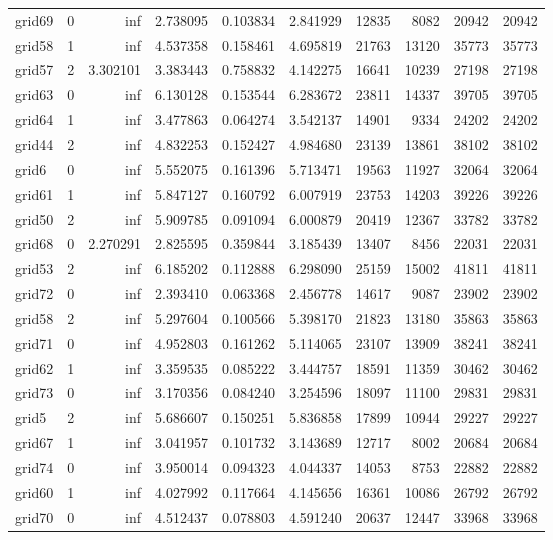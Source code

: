\begin{longtable}{|l|r|r|r|r|r|r|r|r|r|}
grid69 & 0 & inf & 2.738095 & 0.103834 & 2.841929 & 12835 & 8082 & 20942 & 20942 \\
grid58 & 1 & inf & 4.537358 & 0.158461 & 4.695819 & 21763 & 13120 & 35773 & 35773 \\
grid57 & 2 & 3.302101 & 3.383443 & 0.758832 & 4.142275 & 16641 & 10239 & 27198 & 27198 \\
grid63 & 0 & inf & 6.130128 & 0.153544 & 6.283672 & 23811 & 14337 & 39705 & 39705 \\
grid64 & 1 & inf & 3.477863 & 0.064274 & 3.542137 & 14901 & 9334 & 24202 & 24202 \\
grid44 & 2 & inf & 4.832253 & 0.152427 & 4.984680 & 23139 & 13861 & 38102 & 38102 \\
grid6 & 0 & inf & 5.552075 & 0.161396 & 5.713471 & 19563 & 11927 & 32064 & 32064 \\
grid61 & 1 & inf & 5.847127 & 0.160792 & 6.007919 & 23753 & 14203 & 39226 & 39226 \\
grid50 & 2 & inf & 5.909785 & 0.091094 & 6.000879 & 20419 & 12367 & 33782 & 33782 \\
grid68 & 0 & 2.270291 & 2.825595 & 0.359844 & 3.185439 & 13407 & 8456 & 22031 & 22031 \\
grid53 & 2 & inf & 6.185202 & 0.112888 & 6.298090 & 25159 & 15002 & 41811 & 41811 \\
grid72 & 0 & inf & 2.393410 & 0.063368 & 2.456778 & 14617 & 9087 & 23902 & 23902 \\
grid58 & 2 & inf & 5.297604 & 0.100566 & 5.398170 & 21823 & 13180 & 35863 & 35863 \\
grid71 & 0 & inf & 4.952803 & 0.161262 & 5.114065 & 23107 & 13909 & 38241 & 38241 \\
grid62 & 1 & inf & 3.359535 & 0.085222 & 3.444757 & 18591 & 11359 & 30462 & 30462 \\
grid73 & 0 & inf & 3.170356 & 0.084240 & 3.254596 & 18097 & 11100 & 29831 & 29831 \\
grid5 & 2 & inf & 5.686607 & 0.150251 & 5.836858 & 17899 & 10944 & 29227 & 29227 \\
grid67 & 1 & inf & 3.041957 & 0.101732 & 3.143689 & 12717 & 8002 & 20684 & 20684 \\
grid74 & 0 & inf & 3.950014 & 0.094323 & 4.044337 & 14053 & 8753 & 22882 & 22882 \\
grid60 & 1 & inf & 4.027992 & 0.117664 & 4.145656 & 16361 & 10086 & 26792 & 26792 \\
grid70 & 0 & inf & 4.512437 & 0.078803 & 4.591240 & 20637 & 12447 & 33968 & 33968 \\

\end{longtable}
